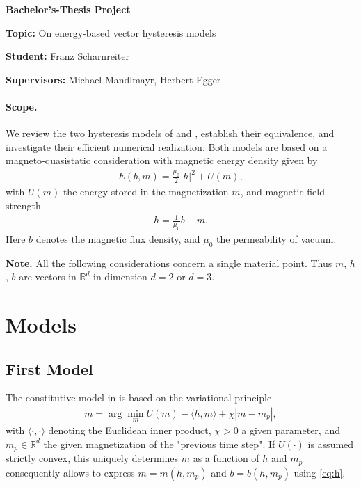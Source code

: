 \documentclass[12pt]{article}
\date{}
\def\RR{\mathbb{R}}
\begin{document}


\begin{center}
    \Large \textbf{Bachelor's-Thesis Project}
\end{center}

\bigskip 
\bigskip 
\bigskip 

\textbf{Topic:} 
On energy-based vector hysteresis models

\medskip 

\textbf{Student:} Franz Scharnreiter

\medskip 

\textbf{Supervisors:}
Michael Mandlmayr, Herbert Egger


\bigskip 

\paragraph{Scope.}

We review the two hysteresis models of \cite{Lavet} and \cite{Prigozhin}, establish their equivalence, and investigate their efficient numerical realization. 
%
Both models are based on a magneto-quasistatic consideration with magnetic energy density given by 
\begin{align} \label{eq:energy}
E(b,m) = \frac{\mu_0}{2} |h|^2 + U(m),
\end{align}
%
with $U(m)$ the energy stored in the magnetization $m$, and magnetic field strength
\begin{align} \label{eq:h}
    h = \frac{1}{\mu_0} b - m.
\end{align}
Here $b$ denotes the magnetic flux density, and $\mu_0$ the permeability of vacuum. 
%

\medskip 

\textbf{Note.}
All the following considerations concern a single material point.
%
Thus $m$, $h$, $b$ are vectors in $\RR^d$ in dimension $d=2$ or $d=3$.

\bigskip

\section{Models}

\subsection{First Model}
The constitutive model in \cite{Lavet} is based on the variational principle
\begin{align} \label{eq:lavet}
    m = \arg\min_m U(m) - \langle h,m\rangle + \chi |m - m_p|, 
\end{align}
with $\langle \cdot,\cdot\rangle$ denoting the Euclidean inner product, $\chi>0$ a given parameter, and $m_p \in \RR^d$ the given magnetization of the "previous time step".
%
If $U(\cdot)$ is assumed strictly convex, this uniquely determines $m$ as a function of $h$ and $m_p$ consequently allows to express $m=m(h,m_p)$ and $b=b(h,m_p)$ using \eqref{eq:h}. 
%
\end{document}
